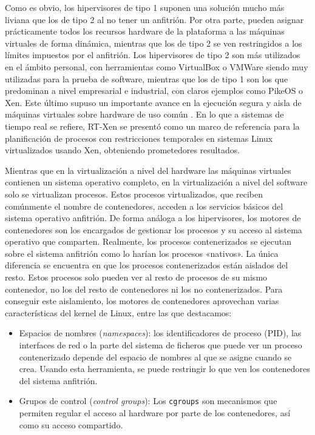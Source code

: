 Como es obvio, los hipervisores de tipo 1 suponen una solución mucho más liviana
que los de tipo 2 al no tener un anfitrión. Por otra parte, pueden asignar
prácticamente todos los recursos hardware de la plataforma a las máquinas
virtuales de forma dinámica, mientras que los de tipo 2 se ven restringidos a
los límites impuestos por el anfitrión. Los hipervisores de tipo 2 son más
utilizados en el ámbito personal, con herramientas como VirtualBox o VMWare
siendo muy utilizadas para la prueba de software, mientras que los de tipo 1 son
los que predominan a nivel empresarial e industrial, con claros ejemplos como
PikeOS o Xen. Este último supuso un importante avance en la ejecución segura y
aisla de máquinas virtuales sobre hardware de uso común \cite{barham_xen_2003}.
En lo que a sistemas de tiempo real se refiere, RT-Xen \cite{xi_rt-xen_2011} se
presentó como un marco de referencia para la planificación de procesos con
restricciones temporales en sistemas Linux virtualizados usando Xen, obteniendo
prometedores resultados.

Mientras que en la virtualización a nivel del hardware las máquinas virtuales
contienen un sistema operativo completo, en la virtualización a nivel del
software solo se virtualizan procesos. Estos procesos virtualizados, que reciben
comúnmente el nombre de contenedores, acceden a los servicios básicos del
sistema operativo anfitrión. De forma análoga a los hipervisores, los motores de
contenedores son los encargados de gestionar los procesos y su acceso al sistema
operativo que comparten. Realmente, los procesos contenerizados se ejecutan
sobre el sistema anfitrión como lo harían los procesos «nativos». La única
diferencia se encuentra en que los procesos contenerizados están aislados del
resto. Estos procesos solo pueden ver al resto de procesos de su mismo
contenedor, no los del resto de contenedores ni los no contenerizados. Para
conseguir este aislamiento, los motores de contenedores aprovechan varias
características del kernel de Linux, entre las que destacamos:

\begin{itemize}
  \item Espacios de nombres (\textit{namespaces}): los identificadores de
        proceso (PID), las interfaces de red o la parte del sistema de ficheros que
        puede ver un proceso contenerizado depende del espacio de nombres al que se
        asigne cuando se crea. Usando esta herramienta, se puede restringir lo que ven
        los contenedores del sistema anfitrión.
  \item Grupos de control (\textit{control groups}): Los \texttt{cgroups} son
        mecanismos que permiten regular el acceso al hardware por parte de los
        contenedores, así como su acceso compartido.
\end{itemize}

